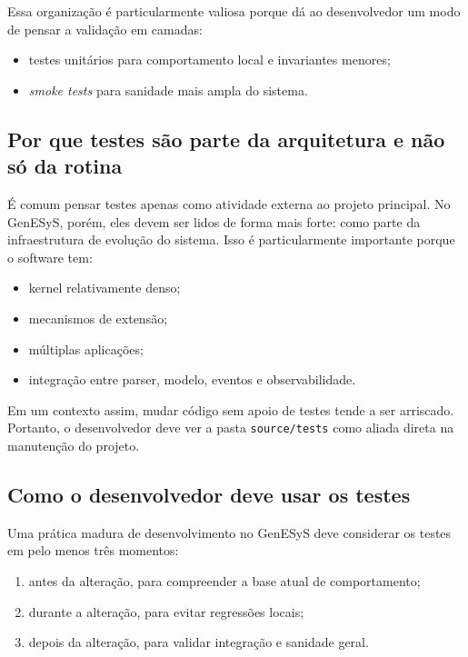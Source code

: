Essa organização é particularmente valiosa porque dá ao desenvolvedor um modo de pensar a validação em camadas:
\begin{itemize}
    \item testes unitários para comportamento local e invariantes menores;
    \item \textit{smoke tests} para sanidade mais ampla do sistema.
\end{itemize}

\subsection{Por que testes são parte da arquitetura e não só da rotina}
\label{subsec:cap10_testes_parte_arquitetura}

É comum pensar testes apenas como atividade externa ao projeto principal. No GenESyS, porém, eles devem ser lidos de forma mais forte: como parte da infraestrutura de evolução do sistema. Isso é particularmente importante porque o software tem:
\begin{itemize}
    \item kernel relativamente denso;
    \item mecanismos de extensão;
    \item múltiplas aplicações;
    \item integração entre parser, modelo, eventos e observabilidade.
\end{itemize}

Em um contexto assim, mudar código sem apoio de testes tende a ser arriscado. Portanto, o desenvolvedor deve ver a pasta \texttt{source/tests} como aliada direta na manutenção do projeto.

\subsection{Como o desenvolvedor deve usar os testes}
\label{subsec:cap10_como_usar_testes}

Uma prática madura de desenvolvimento no GenESyS deve considerar os testes em pelo menos três momentos:
\begin{enumerate}
    \item antes da alteração, para compreender a base atual de comportamento;
    \item durante a alteração, para evitar regressões locais;
    \item depois da alteração, para validar integração e sanidade geral.
\end{enumerate}

